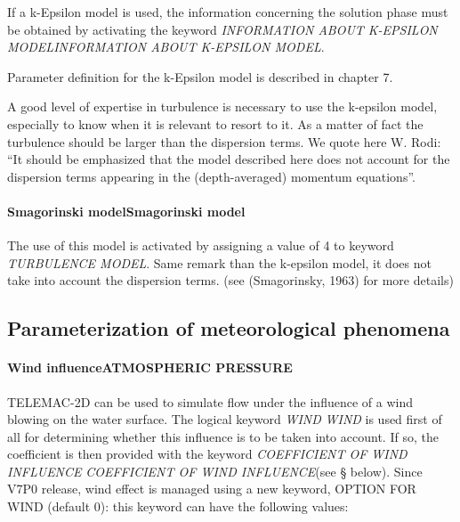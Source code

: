 \documentclass{article} %
\begin{document}
 If a k-Epsilon model is used, the information concerning the solution phase must be obtained by activating the keyword \textit{INFORMATION ABOUT K-EPSILON MODELINFORMATION ABOUT K-EPSILON MODEL}.

 Parameter definition for the k-Epsilon model is described in chapter 7.

 A good level of expertise in turbulence is necessary to use the k-epsilon model, especially to know when it is relevant to resort to it. As a matter of fact the turbulence should be larger than the dispersion terms. We quote here W. Rodi: ``It should be emphasized that the model described here does not account for the dispersion terms appearing in the (depth-averaged) momentum equations''.


\paragraph{ Smagorinski modelSmagorinski model}

 The use of this model is activated by assigning a value of 4 to keyword \textit{TURBULENCE MODEL}. Same remark than the k-epsilon model, it does not take into account the dispersion terms. (see (Smagorinsky, 1963) for more details)


\subsection{ Parameterization of meteorological phenomena}


\paragraph{ Wind influenceATMOSPHERIC PRESSURE}

 TELEMAC-2D can be used to simulate flow under the influence of a wind blowing on the water surface. The logical keyword \textit{WIND} \textit{WIND} is used first of all for determining whether this influence is to be taken into account. If so, the coefficient is then provided with the keyword \textit{COEFFICIENT OF WIND INFLUENCE} \textit{COEFFICIENT OF WIND INFLUENCE}(see {\S} below). Since V7P0 release, wind effect is managed using a new keyword, OPTION FOR WIND (default 0): this keyword can have the following values:
\end{document}
